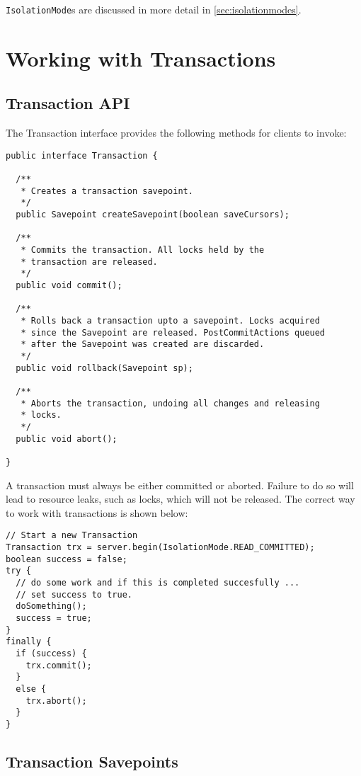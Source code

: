\documentclass[a4paper,draft,oneside]{book}
\begin{document}
\verb|IsolationMode|s are discussed in more detail in \ref{sec:isolationmodes}.

\section{Working with Transactions}

\subsection{Transaction API}

The Transaction interface provides the following methods for clients
to invoke:

\begin{verbatim}
public interface Transaction {
	
  /**
   * Creates a transaction savepoint.
   */
  public Savepoint createSavepoint(boolean saveCursors);

  /**
   * Commits the transaction. All locks held by the
   * transaction are released.
   */
  public void commit();	

  /**
   * Rolls back a transaction upto a savepoint. Locks acquired
   * since the Savepoint are released. PostCommitActions queued
   * after the Savepoint was created are discarded.
   */
  public void rollback(Savepoint sp);	

  /**
   * Aborts the transaction, undoing all changes and releasing 
   * locks.
   */
  public void abort();

}
\end{verbatim}

A transaction must always be either committed or aborted. Failure to
do so will lead to resource leaks, such as locks, which will not be
released.  The correct way to work with transactions is shown below:

\begin{verbatim}
// Start a new Transaction
Transaction trx = server.begin(IsolationMode.READ_COMMITTED);
boolean success = false;
try {
  // do some work and if this is completed succesfully ...
  // set success to true.
  doSomething();
  success = true;
}
finally {
  if (success) {
    trx.commit();
  }
  else {
    trx.abort();
  }
}
\end{verbatim}

\subsection{Transaction Savepoints}
\end{document}
